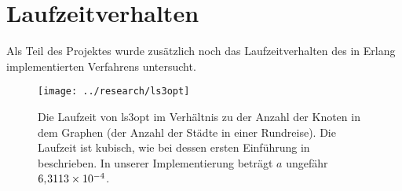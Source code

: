 \section{Laufzeitverhalten}
Als Teil des Projektes wurde zusätzlich noch das Laufzeitverhalten des
in Erlang implementierten Verfahrens untersucht. 
\begin{figure}[H]
  \centering
  \texttt{[image: ../research/ls3opt]}
  \caption[Laufzeit von ls3opt im Verhältnis zu der Anzahl der
  Knoten]{\label{fig:ls3optcomplxty} Die Laufzeit von ls3opt im
    Verhältnis zu der Anzahl der Knoten in dem Graphen (der Anzahl der
    Städte in einer Rundreise).  Die Laufzeit ist kubisch, wie bei
    dessen ersten Einführung in \cite{lin1965computer} beschrieben.
    In unserer Implementierung beträgt $a$ ungefähr
    $6,\kern-1pt 3113 \times 10^{-4}$.} %
\end{figure}


